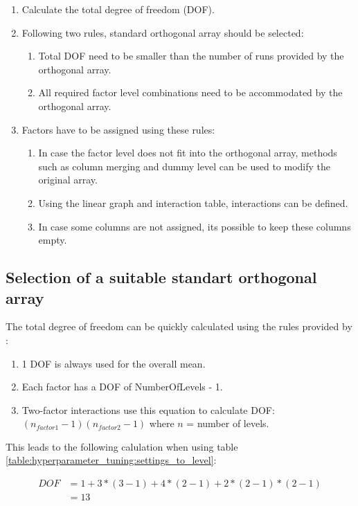 \begin{enumerate}
	\item Calculate the total degree of freedom (DOF). 
	\item Following two rules, standard orthogonal array should be selected:
	\begin{enumerate}
			\item Total DOF need to be smaller than the number of runs provided by the orthogonal array.
			\item All required factor level combinations need to be accommodated by the orthogonal array.
	\end{enumerate}

	\item Factors have to be assigned using these rules: 
	\begin{enumerate}
		\item In case the factor level does not fit into the orthogonal array, methods such as column merging and dummy level can be used to modify the original array.
		\item Using the linear graph and interaction table, interactions can be defined. 
		\item In case some columns are not assigned, its possible to keep these columns empty.
	\end{enumerate}
\end{enumerate}


\subsection{Selection of a suitable standart orthogonal array}
The total degree of freedom can be quickly calculated using the rules provided by \cite{yang_design_2009}:

\begin{enumerate}
	\item 1 DOF is always used for the overall mean. 
	\item Each factor has a DOF of NumberOfLevels - 1.
	\item Two-factor interactions use this equation to calculate DOF: $(n_{factor1} - 1)(n_{factor2} - 1)$ where $n$ = number of levels.
\end{enumerate}

This leads to the following calulation when using table \ref{table:hyperparameter_tuning:settings_to_level}:

\begin{equation} \label{DOF}
	\begin{split}
		DOF & = 1 + 3 * (3 - 1) + 4 * (2 - 1) + 2 * (2 - 1) * (2 - 1) \\
		& = 13
	\end{split}
\end{equation}

